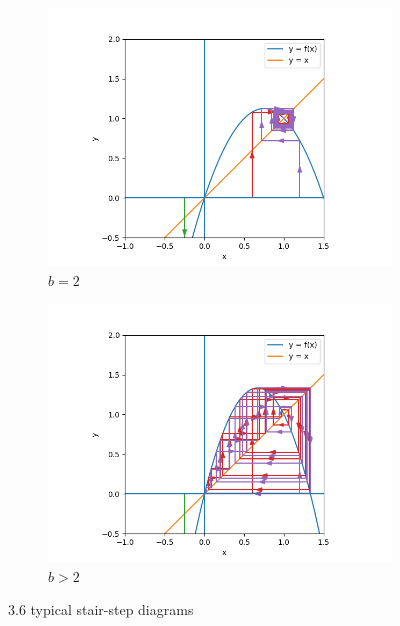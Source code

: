 \documentclass[nonumber]{homework}
\begin{document}
\begin{figure}[h]
\begin{subfigure}{.33\textwidth}
			\includegraphics[width=\linewidth]{3.6 b eq 2.png}
			\caption{$b = 2$}
			\label{fig:3.6eq2}
		\end{subfigure}
		\begin{subfigure}{.33\textwidth}
			\centering
			\includegraphics[width=\linewidth]{3.6 b gt 2.png}
			\caption{$b > 2$}
			\label{fig:3.6gt2}
		\end{subfigure}
		\caption{3.6 typical stair-step diagrams}
		\label{fig:3.6}
	\end{figure}
	
	\newpage
	
	
	
	
	
	
	\newpage
	
\end{document}

